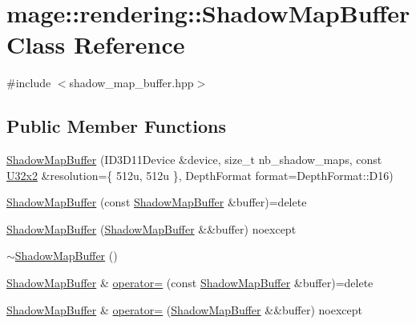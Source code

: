\hypertarget{classmage_1_1rendering_1_1_shadow_map_buffer}{}\section{mage\+:\+:rendering\+:\+:Shadow\+Map\+Buffer Class Reference}
\label{classmage_1_1rendering_1_1_shadow_map_buffer}


{\ttfamily \#include $<$shadow\+\_\+map\+\_\+buffer.\+hpp$>$}

\subsection*{Public Member Functions}
\begin{DoxyCompactItemize}
\item 
\hyperlink{classmage_1_1rendering_1_1_shadow_map_buffer_ad1d94bf0e4ca227064bc5e83d01f3af0}{Shadow\+Map\+Buffer} (I\+D3\+D11\+Device \&device, size\+\_\+t nb\+\_\+shadow\+\_\+maps, const \hyperlink{namespacemage_a88e05bff0300120c013285d3dcad95c5}{U32x2} \&resolution=\{ 512u, 512u \}, Depth\+Format format=\+Depth\+Format\+::\+D16)
\item 
\hyperlink{classmage_1_1rendering_1_1_shadow_map_buffer_a9468f0c15337f9036238233fa17bbcd2}{Shadow\+Map\+Buffer} (const \hyperlink{classmage_1_1rendering_1_1_shadow_map_buffer}{Shadow\+Map\+Buffer} \&buffer)=delete
\item 
\hyperlink{classmage_1_1rendering_1_1_shadow_map_buffer_ac7e9131739e3ec2781d4d445cea906f4}{Shadow\+Map\+Buffer} (\hyperlink{classmage_1_1rendering_1_1_shadow_map_buffer}{Shadow\+Map\+Buffer} \&\&buffer) noexcept
\item 
\hyperlink{classmage_1_1rendering_1_1_shadow_map_buffer_afdce2b148b1ecca6a29db3f5019a8f7a}{$\sim$\+Shadow\+Map\+Buffer} ()
\item 
\hyperlink{classmage_1_1rendering_1_1_shadow_map_buffer}{Shadow\+Map\+Buffer} \& \hyperlink{classmage_1_1rendering_1_1_shadow_map_buffer_a51f61c027adeb55d39767f1be36dd404}{operator=} (const \hyperlink{classmage_1_1rendering_1_1_shadow_map_buffer}{Shadow\+Map\+Buffer} \&buffer)=delete
\item 
\hyperlink{classmage_1_1rendering_1_1_shadow_map_buffer}{Shadow\+Map\+Buffer} \& \hyperlink{classmage_1_1rendering_1_1_shadow_map_buffer_a09a2616afc836a3c8c21347a4473eb08}{operator=} (\hyperlink{classmage_1_1rendering_1_1_shadow_map_buffer}{Shadow\+Map\+Buffer} \&\&buffer) noexcept
\item 

\end{DoxyCompactItemize}
